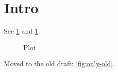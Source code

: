 \documentclass{article}
\begin{document}

\section{Intro}\label{sec:intro}
See \ref{sec:intro} and \ref{fig:plot}.
\begin{figure}\caption{Plot}\label{fig:plot}\end{figure}
Moved to the old draft: \ref{fig:only-old}.
\end{document}
